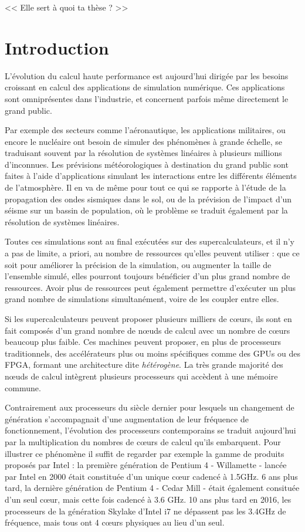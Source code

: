 \begin{savequote}[12cm]
<< Elle sert à quoi ta thèse ? >>

\end{savequote}
\chapter{Introduction}
\chaptertoc

L'évolution du calcul haute performance est aujourd'hui dirigée par les besoins croissant en calcul des applications de simulation numérique.
Ces applications sont omniprésentes dans l'industrie, et concernent parfois même directement le grand public.

Par exemple des secteurs comme l'aéronautique, les applications militaires, ou encore le nucléaire ont besoin de simuler des phénomènes à grande échelle, se traduisant souvent par la résolution de systèmes linéaires à plusieurs millions d'inconnues.
Les prévisions météorologiques à destination du grand public sont faites à l'aide d'applications simulant les interactions entre les différents éléments de l'atmosphère.
Il en va de même pour tout ce qui se rapporte à l'étude de la propagation des ondes sismiques dans le sol, ou de la prévision de l'impact d'un séisme sur un bassin de population, où le problème se traduit également par la résolution de systèmes linéaires.

Toutes ces simulations sont au final exécutées sur des supercalculateurs, et il n'y a pas de limite, a priori, au nombre de ressources qu'elles peuvent utiliser : que ce soit pour améliorer la précision de la simulation, ou augmenter la taille de l'ensemble simulé, elles pourront toujours bénéficier d'un plus grand nombre de ressources.
Avoir plus de ressources peut également permettre d'exécuter un plus grand nombre de simulations simultanément, voire de les coupler entre elles.

Si les supercalculateurs peuvent proposer plusieurs milliers de cœurs, ils sont en fait composés d'un grand nombre de nœuds de calcul avec un nombre de cœurs beaucoup plus faible.
Ces machines peuvent proposer, en plus de processeurs traditionnels, des accélérateurs plus ou moins spécifiques comme des GPUs ou des FPGA, formant une architecture dite \emph{hétérogène}.
La très grande majorité des nœuds de calcul intègrent plusieurs processeurs qui accèdent à une mémoire commune.

Contrairement aux processeurs du siècle dernier pour lesquels un changement de génération s'accompagnait d'une augmentation de leur fréquence de fonctionnement, l'évolution des processeurs contemporains se traduit aujourd'hui par la multiplication du nombres de cœurs de calcul qu'ils embarquent.
Pour illustrer ce phénomène il suffit de regarder par exemple la gamme de produits proposés par Intel : la première génération de Pentium 4 - Willamette - lancée par Intel en 2000 était constituée d'un unique cœur cadencé à 1.5GHz. 6 ans plus tard, la dernière génération de Pentium 4 - Cedar Mill - était également consituée d'un seul cœur, mais cette fois cadencé à 3.6 GHz. 10 ans plus tard en 2016, les processeurs de la génération Skylake d'Intel i7 ne dépassent pas les 3.4GHz de fréquence, mais tous ont 4 cœurs physiques au lieu d'un seul.

